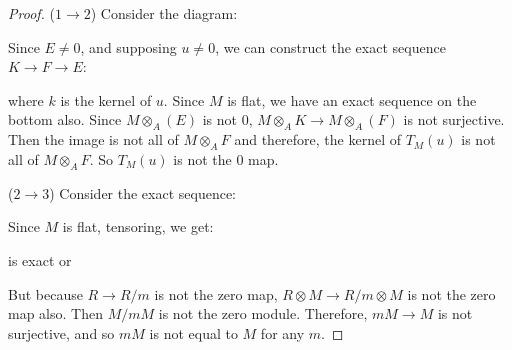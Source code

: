 \documentclass{article}
\begin{document}
    \begin{proof}
        ($1 \rightarrow 2$) Consider the diagram:
            \begin{center}
            \end{center}
        Since $E \neq 0$, and supposing $u \neq 0$, we can construct the exact sequence $K \rightarrow F \rightarrow E$:
            \begin{center}
            \end{center}
        where $k$ is the kernel of $u$. Since $M$ is flat, we have an exact sequence on the bottom also. Since $M \otimes_{A} (E)$ is not $0$, $M \otimes_{A} K \rightarrow M\otimes_{A}(F)$ is not surjective. Then the image is not all of $M \otimes_{A}F$ and therefore, the kernel of $T_{M}(u)$ is not all of $M \otimes_{A}F$. So $T_{M}(u)$ is not the $0$ map.

        ($2 \rightarrow 3$) Consider the exact sequence:
            \begin{center}
            \end{center}
        Since $M$ is flat, tensoring, we get:
            \begin{center}
            \end{center}
        is exact or
            \begin{center}
            \end{center}
        But because $R \rightarrow R/m$ is not the zero map, $R \otimes M \rightarrow R/m \otimes M$ is not the zero map also. Then $M/mM$ is not the zero module. Therefore, $mM \rightarrow M$ is not surjective, and so $mM$ is not equal to $M$ for any $m$.


\end{proof}
\end{document}
